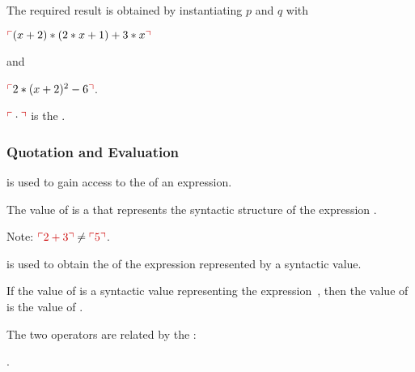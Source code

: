 \documentclass[t,12pt,numbers,fleqn]{beamer}
\begin{document}
\begin{frame}
\bigskip


\medskip

  \item<6-> The required result is obtained by instantiating $p$ and
    $q$ with

  \bi

    \item[] $\redsynbrack{(x + 2) * (2 * x + 1) + 3 * x}$ 

  \ei

  and

  \bi

    \item[] $\redsynbrack{2 * (x + 2)^2 - 6}$.

  \ei

\medskip

  $\redsynbrack{\cdot}$ is the .

\ei
\end{frame}


\begin{frame}
\frametitle{Quotation and Evaluation}
\bi

  \item {} is used to gain access to the
     of an expression.

  \bi

    \item The value of  is a  that represents the syntactic structure of the expression
      .

    \item Note: $\bred{\synbrack{2 + 3}} \not= \bred{\synbrack{5}}$.

  \ei

\pause
\medskip

  \item {} is used to obtain the  of
    the expression represented by a syntactic value.

  \bi

    \item If the value of  is a syntactic value
      representing the expression~, then the value of
       is the value of .

  \ei

\pause
\medskip

  \item The two operators are related by the :

  \bi

    \item[] .

  \ei

\ei
\end{frame}
\end{document}
